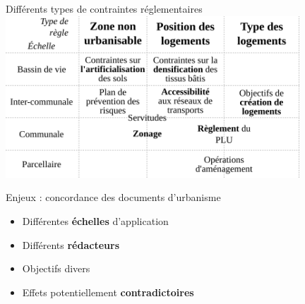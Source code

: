 \documentclass[xcolor=table]{beamer}
\begin{document}
\begin{frame}{Différents types de contraintes réglementaires} 
	\includegraphics[width=11cm]{Images/synthese-doc.png}	
\end{frame}



\begin{frame}{Enjeux : concordance des documents d'urbanisme}
	\begin{itemize}
		\item Différentes \textbf{échelles} d'application
		\item Différents \textbf{rédacteurs}
		\item Objectifs divers
		\item Effets potentiellement \textbf{contradictoires}
	\end{itemize}
\end{frame}
\end{document}
